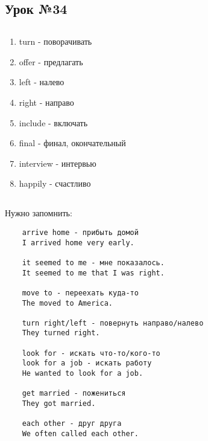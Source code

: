 \subsection{Урок №34}

\subsection*{}
\begin{multicols}{2}
    \begin{enumerate}\setlength{\itemsep}{0pt}
        \item turn - поворачивать
        \item offer - предлагать
        \item left - налево
        \item right - направо
        \item include - включать
        \item final - финал, окончательный
        \item interview - интервью
        \item happily - счастливо
    \end{enumerate}
\end{multicols}

\subsection*{}
Нужно запомнить:
\begin{verbatim}
    arrive home - прибыть домой
    I arrived home very early.

    it seemed to me - мне показалось.
    It seemed to me that I was right.

    move to - переехать куда-то
    The moved to America.

    turn right/left - повернуть направо/налево
    They turned right.

    look for - искать что-то/кого-то
    look for a job - искать работу
    He wanted to look for a job.

    get married - пожениться
    They got married.

    each other - друг друга
    We often called each other.
\end{verbatim}